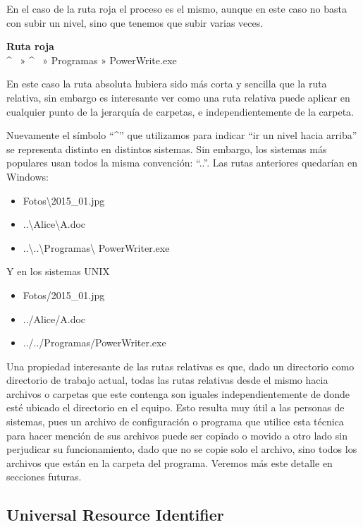 En el caso de la ruta roja el proceso es el mismo, aunque en este caso no basta
con subir un nivel, sino que tenemos que subir varias veces.

\begin{example}
    \textbf{Ruta roja}\\
    \textasciicircum ~ » \textasciicircum ~ » Programas » PowerWrite.exe
\end{example}

En este caso la ruta absoluta hubiera sido más corta y sencilla que la ruta
relativa, sin embargo es interesante ver como una ruta relativa puede aplicar en
cualquier punto de la jerarquía de carpetas, e independientemente de la carpeta.

Nuevamente el símbolo ``\textasciicircum'' que utilizamos para indicar ``ir un
nivel hacia arriba'' se representa distinto en distintos sistemas. Sin embargo,
los sistemas más populares usan todos la misma convención: ``..''. Las rutas
anteriores quedarían en Windows:

\begin{itemize}
    \item Fotos\textbackslash 2015\_01.jpg
    \item ..\textbackslash Alice\textbackslash A.doc
    \item ..\textbackslash ..\textbackslash Programas\textbackslash
    PowerWriter.exe
\end{itemize}

Y en los sistemas UNIX
\begin{itemize}
    \item Fotos/2015\_01.jpg
    \item ../Alice/A.doc
    \item ../../Programas/PowerWriter.exe
\end{itemize}

Una propiedad interesante de las rutas relativas es que, dado un directorio como
directorio de trabajo actual, todas las rutas relativas desde el mismo hacia
archivos o carpetas que este contenga son iguales independientemente de donde
esté ubicado el directorio en el equipo. Esto resulta muy útil a las personas de
sistemas, pues un archivo de configuración o programa que utilice esta técnica
para hacer mención de sus archivos puede ser copiado o movido a otro lado sin
perjudicar su funcionamiento, dado que no se copie solo el archivo, sino todos
los archivos que están en la carpeta del programa. Veremos más este detalle en
secciones futuras.

\subsection{Universal Resource Identifier}
\label{chap:informatica:subsec:uris}

